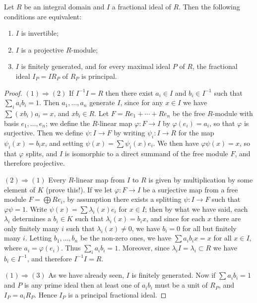 \begin{theorem}\label{thm:11.3}
Let $R$ be an integral domain and $I$ a fractional ideal of $R$.
Then the following conditions are equivalent:
\begin{enumerate}[(1)]
  \item $I$ is invertible;
  \item $I$ is a projective $R$-module;
  \item $I$ is finitely generated, and for every maximal ideal $P$ of $R$, the
        fractional ideal $I_P = IR_P$ of $R_P$ is principal.
\end{enumerate}
\end{theorem}

\begin{proof}
$(1) \Rightarrow (2)$ If $I^{-1}I = R$ then there exist $a_i \in I$ and $b_i \in I^{-1}$ such that
$\sum_i a_ib_i = 1$. Then $a_1, \ldots, a_n$ generate $I$, since for any $x \in I$ we have $\sum (xb_i)a_i =
x$, and $xb_i \in R$. Let $F = Re_1 + \cdots + Re_n$ be the free $R$-module with basis
$e_1, \ldots, e_n$; we define the $R$-linear map $\varphi\colon F \to I$ by $\varphi(e_i) = a_i$, so that $\varphi$ is
surjective. Then we define $\psi\colon I \to F$ by writing $\psi_i\colon I \to R$ for the map
$\psi_i(x) = b_ix$, and setting $\psi(x) = \sum \psi_i(x)e_i$. We then have $\varphi\psi(x) = x$, so that $\varphi$
splits, and $I$ is isomorphic to a direct summand of the free module $F$, and
therefore projective.

$(2) \Rightarrow (1)$ Every $R$-linear map from $I$ to $R$ is given by multiplication by
some element of $K$ (prove this!). If we let $\varphi\colon F \to I$ be a surjective map from
a free module $F = \bigoplus Re_i$, by assumption there exists a splitting $\psi\colon I \to F$
such that $\varphi\psi = 1$. Write $\psi(x) = \sum \lambda_i(x)e_i$ for $x \in I$; then by what we have said,
each $\lambda_i$ determines a $b_i \in K$ such that $\lambda_i(x) = b_ix$, and since for each $x$ there
are only finitely many $i$ such that $\lambda_i(x) \neq 0$, we have $b_i = 0$ for all but finitely
many $i$. Letting $b_1, \ldots, b_n$ be the non-zero ones, we have $\sum a_ib_ix = x$ for all
$x \in I$, where $a_i = \varphi(e_i)$. Thus $\sum_i a_ib_i = 1$. Moreover, since $\lambda_iI = \lambda_i \subset R$ we
have $b_i \in I^{-1}$, and therefore $I^{-1}I = R$.

$(1) \Rightarrow (3)$ As we have already seen, $I$ is finitely generated. Now if $\sum a_ib_i = 1$
and $P$ is any prime ideal then at least one of $a_ib_i$ must be a unit of $R_P$,
and $I_P = a_iR_P$. Hence $I_P$ is a principal fractional ideal.


\end{proof}
